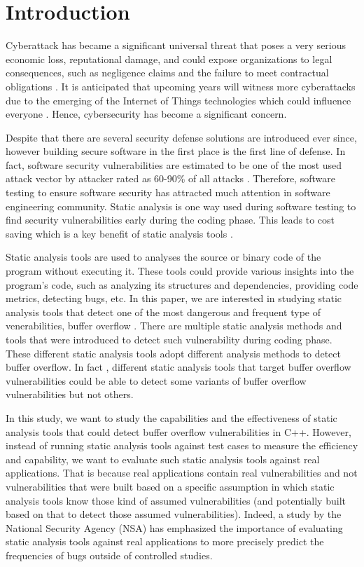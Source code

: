 \section{Introduction}
Cyberattack has became a significant universal threat that poses a very serious economic loss, reputational damage, and could expose organizations to legal consequences, such as negligence claims and the failure to meet contractual obligations \cite{mcafee2014}. It is anticipated that upcoming years will witness more cyberattacks due to the emerging of the Internet of Things technologies which could influence everyone \cite{securitynewsdesk2017}. Hence, cybersecurity has become a significant concern. 

Despite that there are several security defense solutions are introduced ever since, however building secure software in the first place is the first line of defense. In fact, software security vulnerabilities are estimated to be one of the most used attack vector by attacker rated as 60-90\% of all attacks \cite{heimdalsecurity2016}. Therefore, software testing to ensure software security has attracted much attention in software engineering community. Static analysis is one way used during software testing to find security vulnerabilities early during the coding phase. This leads to cost saving which is a key benefit of static analysis tools \cite{soni2006defect}.  

Static analysis tools are used to analyses the source or binary code of the program without executing it. These tools could provide various insights into the program's code, such as analyzing its structures and dependencies, providing code metrics, detecting bugs, etc. In this paper, we are interested in studying static analysis tools that detect one of the most dangerous and frequent type of venerabilities, buffer overflow \cite{Cowan2003}.  There are multiple static analysis methods and tools that were introduced to detect such vulnerability during coding phase. These different static analysis tools adopt different analysis methods to detect buffer overflow. In fact , different static analysis tools that target buffer overflow vulnerabilities could be able to detect some variants of buffer overflow vulnerabilities but not others.

In this study, we want to study the capabilities and the effectiveness of static analysis tools that could detect buffer overflow vulnerabilities in C++. However, instead of running static analysis tools against test cases to measure the efficiency and capability, we want to evaluate such static analysis tools against real applications. That is because real applications contain real vulnerabilities and not vulnerabilities that were built based on a specific assumption in which static analysis tools know those kind of assumed vulnerabilities (and potentially built based on that to detect those assumed vulnerabilities). Indeed, a study by the National Security Agency (NSA) \cite{nsa2011} has emphasized the importance of evaluating static analysis tools against real applications to more  precisely predict the frequencies of bugs outside of controlled studies.

